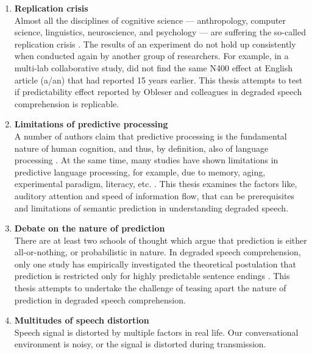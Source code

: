 \documentclass[a4paper, nobind]{templates/ociamthesis}
\begin{document}
\begin{enumerate}
\def\labelenumi{(\roman{enumi})}
\item
  \textbf{Replication crisis}\\
  Almost all the disciplines of cognitive science --- anthropology, computer science, linguistics, neuroscience, and psychology --- are suffering the so-called replication crisis \autocites[e.g.,][]{Sanderson2008,OSC2015,Ebersole2016,Cockburn2020}.
  The results of an experiment do not hold up consistently when conducted again by another group of researchers.
  For example, in a multi-lab collaborative study, \textcite{Nieuwland2020a} did not find the same N400 effect at English article (a/an) that \textcite{Delong2005} had reported 15 years earlier.
  This thesis attempts to test if predictability effect reported by Obleser and colleagues in degraded speech comprehension \autocite{Obleser2007,Obleser2010,Obleser2011} is replicable.
\item
  \textbf{Limitations of predictive processing}\\
  A number of authors claim that predictive processing is the fundamental nature of human cognition, and thus, by definition, also of language processing \autocite{Clark2013,Lupyan2015,Kuperberg2020,Friston2020,Friston2020b}.
  At the same time, many studies have shown limitations in predictive language processing, for example, due to memory, aging, experimental paradigm, literacy, etc. \autocite{Federmeier2010,Mishra2012,Huettig2016,Huettig2019}.
  This thesis examines the factors like, auditory attention and speed of information flow, that can be prerequisites and limitations of semantic prediction in understanding degraded speech.
\item
  \textbf{Debate on the nature of prediction}\\
  There are at least two schools of thought which argue that prediction is either all-or-nothing, or probabilistic in nature.
  In degraded speech comprehension, only one study has empirically investigated the theoretical postulation that prediction is restricted only for highly predictable sentence endings \autocite{Strauss2013}.
  This thesis attempts to undertake the challenge of teasing apart the nature of prediction in degraded speech comprehension.
\item
  \textbf{Multitudes of speech distortion}\\
  Speech signal is distorted by multiple factors in real life.
  Our conversational environment is noisy, or the signal is distorted during transmission.

\end{enumerate}
\end{document}
